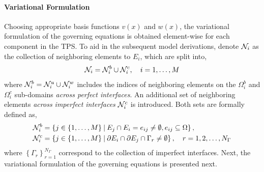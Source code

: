 \paragraph*{Variational Formulation} Choosing appropriate basis functions $v(x)$ and $w(x)$, the variational formulation of the governing equations is obtained element-wise for each component in the TPS. To aid in the subsequent model derivations, denote $\mathcal{N}_i$ as the collection of neighboring elements to $E_i$, which are split into,
\begin{equation}
    \mathcal{N}_i = \mathcal{N}_i^{b}\cup\mathcal{N}_{i}^{c},\quad i=1,\dots,M
\end{equation}
where $\mathcal{N}_i^{b}=\mathcal{N}_i^u\cup\mathcal{N}_i^w$ includes the indices of neighboring elements on the $\Omega_i^b$ and $\Omega_i^c$ sub-domains \emph{across perfect interfaces}. An additional set of neighboring elements \emph{across imperfect interfaces} $\mathcal{N}_i^c$ is introduced. Both sets are formally defined as,
\begin{subequations}
    \begin{align}
        \mathcal{N}_i^{b} &= \left\{j\in\{1,\ldots,M\} \:|\: E_j\cap E_i = e_{ij}\neq\emptyset, e_{ij}\subseteq\Omega\right\},\\
        \mathcal{N}_{i}^{c} &= \left\{j\in\{1,\ldots,M\} \:|\: \partial E_i\cap \partial E_j \cap\Gamma_r \neq \emptyset\right\},\quad r=1,2,\dots,N_{\Gamma}
    \end{align}
\end{subequations}
where $\left\{\Gamma_r\right\}_{r=1}^{N_\Gamma}$ correspond to the collection of imperfect interfaces. Next, the variational formulation of the governing equations is presented next.

